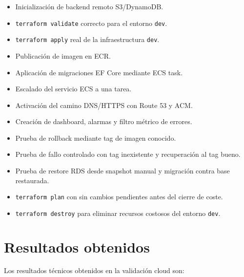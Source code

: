 \begin{itemize}
  \item Inicialización de backend remoto S3/DynamoDB.
  \item \texttt{terraform validate} correcto para el entorno \texttt{dev}.
  \item \texttt{terraform apply} real de la infraestructura \texttt{dev}.
  \item Publicación de imagen en ECR.
  \item Aplicación de migraciones EF Core mediante ECS task.
  \item Escalado del servicio ECS a una tarea.
  \item Activación del camino DNS/HTTPS con Route 53 y ACM.
  \item Creación de dashboard, alarmas y filtro métrico de errores.
  \item Prueba de rollback mediante tag de imagen conocido.
  \item Prueba de fallo controlado con tag inexistente y recuperación al tag bueno.
  \item Prueba de restore RDS desde snapshot manual y migración contra base restaurada.
  \item \texttt{terraform plan} con  sin cambios pendientes antes del cierre de coste.
  \item \texttt{terraform destroy} para eliminar recursos costosos del entorno \texttt{dev}.
\end{itemize}

\section{Resultados obtenidos}
\label{sec:resultados-obtenidos}

Los resultados técnicos obtenidos en la validación cloud son:

